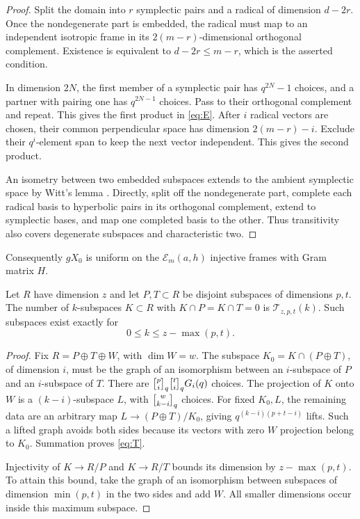 \begin{proof}
Split the domain into $r$ symplectic pairs and a radical of dimension
$d-2r$. Once the nondegenerate part is embedded, the radical must map
to an independent isotropic frame in its $2(m-r)$-dimensional
orthogonal complement. Existence is equivalent to
$d-2r\le m-r$, which is the asserted condition.

In dimension $2N$, the first member of a symplectic pair has $q^{2N}-1$
choices, and a partner with pairing one has $q^{2N-1}$ choices.
Pass to their orthogonal complement and repeat. This gives the first
product in \eqref{eq:E}. After $i$ radical vectors are chosen, their
common perpendicular space has dimension $2(m-r)-i$. Exclude their
$q^i$-element span to keep the next vector independent. This gives the
second product.

An isometry between two embedded subspaces extends to the ambient
symplectic space by Witt's lemma \cite[Theorem 3.4]{SprehnWahl}. Directly,
split off the nondegenerate part, complete each radical basis to
hyperbolic pairs in its orthogonal complement, extend to symplectic
bases, and map one completed basis to the other. Thus transitivity
also covers degenerate subspaces and characteristic two.
\end{proof}

Consequently $gX_0$ is uniform on the $\mathcal E_m(a,h)$ injective
frames with Gram matrix $H$.

\begin{lemma}\label{lem:transverse}
Let $R$ have dimension $z$ and let $P,T\subset R$ be disjoint subspaces
of dimensions $p,t$. The number of $k$-subspaces $K\subset R$ with
$K\cap P=K\cap T=0$ is $\mathcal T_{z,p,t}(k)$. Such subspaces exist
exactly for
\begin{equation}\label{eq:kmax}
 0\le k\le z-\max(p,t).
\end{equation}
\end{lemma}

\begin{proof}
Fix $R=P\oplus T\oplus W$, with $\dim W=w$.
The subspace $K_0=K\cap(P\oplus T)$, of dimension $i$, must be the
graph of an isomorphism between an $i$-subspace of $P$ and an
$i$-subspace of $T$. There are $\gb pi\gb tiG_i(q)$ choices.
The projection of $K$ onto $W$ is a $(k-i)$-subspace $L$, with
$\gb w{k-i}$ choices. For fixed $K_0,L$, the remaining data are an
arbitrary map $L\to(P\oplus T)/K_0$, giving
$q^{(k-i)(p+t-i)}$ lifts. Such a lifted graph avoids both sides because
its vectors with zero $W$ projection belong to $K_0$. Summation proves
\eqref{eq:T}.

Injectivity of $K\to R/P$ and $K\to R/T$ bounds its dimension by
$z-\max(p,t)$. To attain this bound, take the graph of an isomorphism
between subspaces of dimension $\min(p,t)$ in the two sides and add
$W$. All smaller dimensions occur inside this maximum subspace.
\end{proof}

